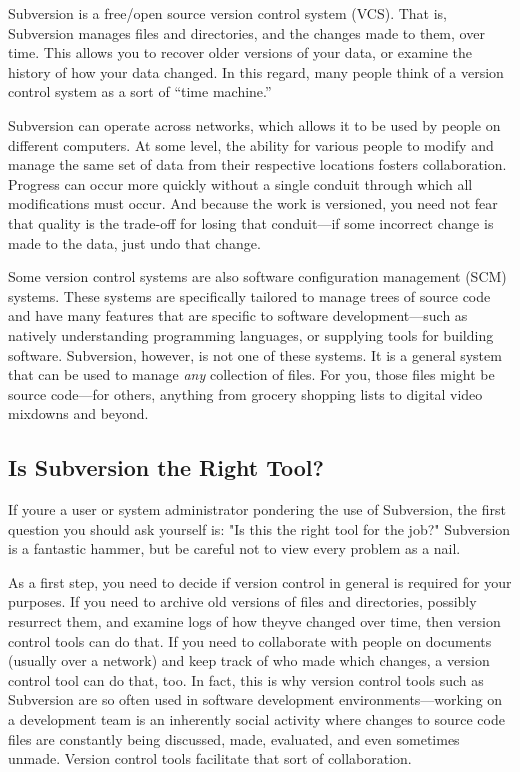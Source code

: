Subversion is a free/open source version control system (VCS). That is,
Subversion manages files and directories, and the changes made to them,
over time. This allows you to recover older versions of your data, or
examine the history of how your data changed. In this regard, many
people think of a version control system as a sort of ``time machine.''

Subversion can operate across networks, which allows it to be used by
people on different computers. At some level, the ability for various
people to modify and manage the same set of data from their respective
locations fosters collaboration. Progress can occur more quickly without
a single conduit through which all modifications must occur. And because
the work is versioned, you need not fear that quality is the trade-off
for losing that conduit---if some incorrect change is made to the data,
just undo that change.

Some version control systems are also software configuration management
(SCM) systems. These systems are specifically tailored to manage trees
of source code and have many features that are specific to software
development---such as natively understanding programming languages, or
supplying tools for building software. Subversion, however, is not one
of these systems. It is a general system that can be used to manage
\emph{any} collection of files. For you, those files might be source
code---for others, anything from grocery shopping lists to digital video
mixdowns and beyond.

\subsection{Is Subversion the Right Tool?}\label{svn.intro.righttool}

If you\textquotesingle re a user or system administrator pondering the
use of Subversion, the first question you should ask yourself is: "Is
this the right tool for the job?" Subversion is a fantastic hammer, but
be careful not to view every problem as a nail.

As a first step, you need to decide if version control in general is
required for your purposes. If you need to archive old versions of files
and directories, possibly resurrect them, and examine logs of how
they\textquotesingle ve changed over time, then version control tools
can do that. If you need to collaborate with people on documents
(usually over a network) and keep track of who made which changes, a
version control tool can do that, too. In fact, this is why version
control tools such as Subversion are so often used in software
development environments---working on a development team is an
inherently social activity where changes to source code files are
constantly being discussed, made, evaluated, and even sometimes unmade.
Version control tools facilitate that sort of collaboration.

